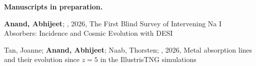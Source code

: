 \textbf{Manuscripts in preparation.} \\


\item[{\color{numcolor}\scriptsize1}] \textbf{Anand, Abhijeet}; \etal, 2026, {The First Blind Survey of Intervening Na I Absorbers: Incidence and Cosmic Evolution with DESI}

\item[{\color{numcolor}\scriptsize2}] Tan, Joanne; \textbf{Anand, Abhijeet}; Naab, Thorsten; \etal, 2026, {Metal absorption lines and their evolution since $z = 5$ in the IllustrisTNG simulations}


